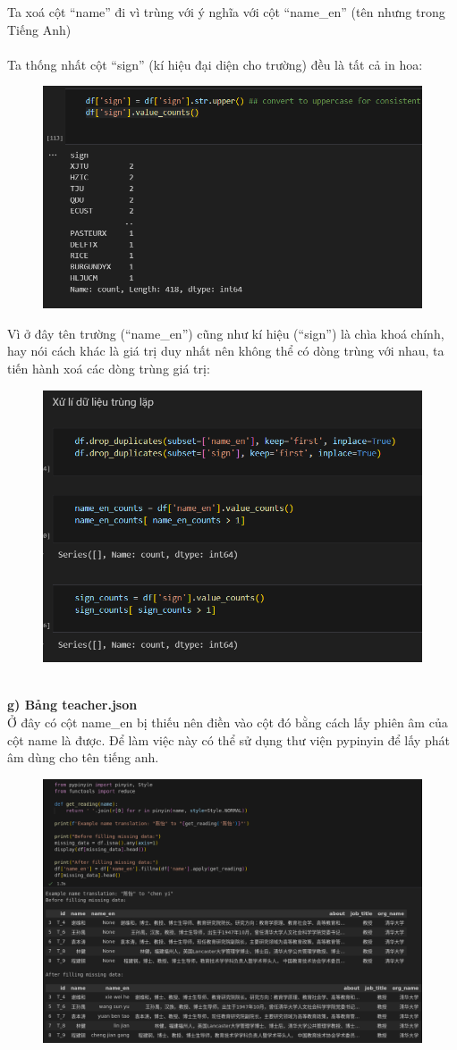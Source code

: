Ta xoá cột “name” đi vì trùng với ý nghĩa với cột “name\_en” (tên nhưng trong Tiếng Anh)\\
\\
Ta thống nhất cột “sign” (kí hiệu đại diện cho trường) đều là tất cả in hoa:
\newpage
\begin{figure}
    \centering
    \includegraphics[width=0.7\linewidth]{figures/50.png}
\end{figure}
Vì ở đây tên trường (“name\_en”) cũng như kí hiệu (“sign”) là chìa khoá chính, hay nói cách khác là giá trị duy nhất nên không thể có dòng trùng với nhau, ta tiến hành xoá các dòng trùng giá trị:
\begin{figure}[h]
    \centering
    \includegraphics[width=0.7\linewidth]{figures/51.png}
\end{figure}\\
\textbf{g) Bảng teacher.json}\\
Ở đây có cột name\_en bị thiếu nên điền vào cột đó bằng cách lấy phiên âm của cột name là được. Để làm việc này có thể sử dụng thư viện pypinyin để lấy phát âm dùng cho tên tiếng anh.
\newpage
\begin{figure}
    \centering
    \includegraphics[width=0.8\linewidth]{figures/52.png}
\end{figure}
